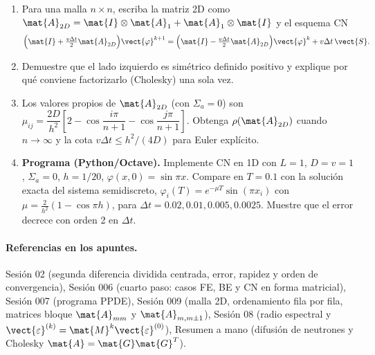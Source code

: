 
\begin{enunciado}
\begin{enumerate}[label=(\alph*)]
  \item Para una malla $n\times n$, escriba la matriz 2D como
        $\mat{A}_{2D} = \mat{I}\otimes\mat{A}_1 + \mat{A}_1\otimes\mat{I}$ y el esquema CN
        \[
          \Big(\mat{I} + \tfrac{v\Delta t}{2}\mat{A}_{2D}\Big)\vect{\varphi}^{k+1}
          = \Big(\mat{I} - \tfrac{v\Delta t}{2}\mat{A}_{2D}\Big)\vect{\varphi}^{k} + v\Delta t\,\vect{S}.
        \]
  \item Demuestre que el lado izquierdo es simétrico definido positivo y explique por qué conviene
        factorizarlo (Cholesky) una sola vez.
  \item Los valores propios de $\mat{A}_{2D}$ (con $\Sigma_a = 0$) son
        $\mu_{ij} = \dfrac{2D}{h^2}\left[2 - \cos\dfrac{i\pi}{n+1} - \cos\dfrac{j\pi}{n+1}\right]$.
        Obtenga $\rho(\mat{A}_{2D})$ cuando $n\to\infty$ y la cota $v\Delta t \le h^2/(4D)$ para Euler explícito.
  \item \textbf{Programa (Python/Octave).} Implemente CN en 1D con $L = 1$, $D = v = 1$,
        $\Sigma_a = 0$, $h = 1/20$, $\varphi(x, 0) = \sin\pi x$. Compare en $T = 0.1$ con la solución
        exacta del sistema semidiscreto, $\varphi_i(T) = e^{-\mu T}\sin(\pi x_i)$ con
        $\mu = \frac{2}{h^2}(1 - \cos\pi h)$, para $\Delta t = 0.02, 0.01, 0.005, 0.0025$.
        Muestre que el error decrece con orden 2 en $\Delta t$.
\end{enumerate}
\end{enunciado}

\paragraph{Referencias en los apuntes.} Sesión 02 (segunda diferencia dividida centrada, error,
rapidez y orden de convergencia), Sesión 006 (cuarto paso: casos FE, BE y CN en forma matricial),
Sesión 007 (programa PPDE), Sesión 009 (malla 2D, ordenamiento fila por fila, matrices bloque
$\mat{A}_{mm}$ y $\mat{A}_{m,m\pm1}$), Sesión 08 (radio espectral y $\vect{\varepsilon}^{(k)} = \mat{M}^k\vect{\varepsilon}^{(0)}$),
Resumen a mano (difusión de neutrones y Cholesky $\mat{A} = \mat{G}\mat{G}^T$).

